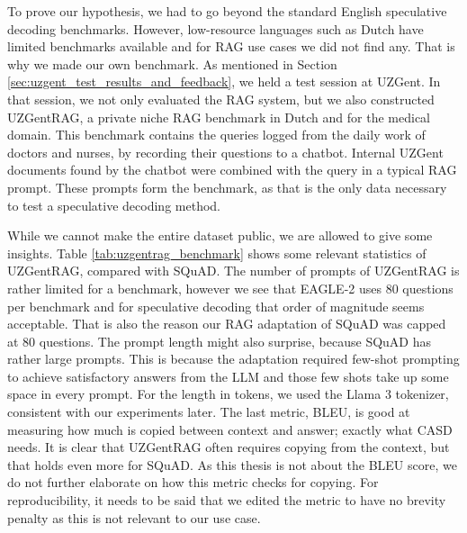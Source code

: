 To prove our hypothesis, we had to go beyond the standard English speculative decoding benchmarks. However, low-resource languages such as Dutch have limited benchmarks available and for RAG use cases we did not find any. That is why we made our own benchmark. As mentioned in Section \ref{sec:uzgent_test_results_and_feedback}, we held a test session at UZGent. In that session, we not only evaluated the RAG system, but we also constructed UZGentRAG, a private niche RAG benchmark in Dutch and for the medical domain. This benchmark contains the queries logged from the daily work of doctors and nurses, by recording their questions to a chatbot. Internal UZGent documents found by the chatbot were combined with the query in a typical RAG prompt. These prompts form the benchmark, as that is the only data necessary to test a speculative decoding method.

While we cannot make the entire dataset public, we are allowed to give some insights. Table \ref{tab:uzgentrag_benchmark} shows some relevant statistics of UZGentRAG, compared with SQuAD. The number of prompts of UZGentRAG is rather limited for a benchmark, however we see that EAGLE-2 uses 80 questions per benchmark and for speculative decoding that order of magnitude seems acceptable. That is also the reason our RAG adaptation of SQuAD was capped at 80 questions. The prompt length might also surprise, because SQuAD has rather large prompts. This is because the adaptation required few-shot prompting to achieve satisfactory answers from the LLM and those few shots take up some space in every prompt. For the length in tokens, we used the Llama 3 \cite{grattafiori2024llama} tokenizer, consistent with our experiments later. The last metric, BLEU, is good at measuring how much is copied between context and answer; exactly what CASD needs. It is clear that UZGentRAG often requires copying from the context, but that holds even more for SQuAD. As this thesis is not about the BLEU score, we do not further elaborate on how this metric checks for copying. For reproducibility, it needs to be said that we edited the metric to have no brevity penalty as this is not relevant to our use case.

